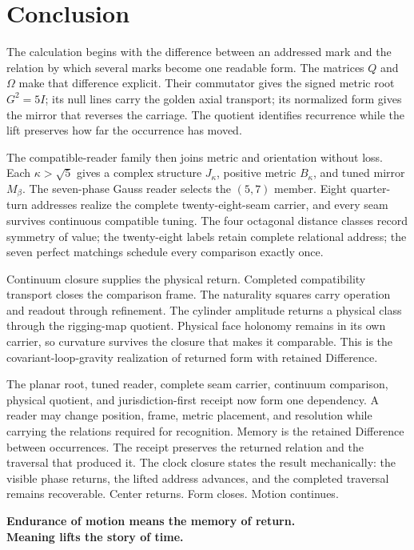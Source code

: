 \documentclass[10pt]{article}
\begin{document}
\section{Conclusion}
The calculation begins with the difference between an addressed mark and the relation by which several marks become one readable form. The matrices $Q$ and $\Omega$ make that difference explicit. Their commutator gives the signed metric root $G^2=5I$; its null lines carry the golden axial transport; its normalized form gives the mirror that reverses the carriage. The quotient identifies recurrence while the lift preserves how far the occurrence has moved.

The compatible-reader family then joins metric and orientation without loss. Each $\kappa>\sqrt5$ gives a complex structure $J_\kappa$, positive metric $B_\kappa$, and tuned mirror $M_\beta$. The seven-phase Gauss reader selects the $(5,7)$ member. Eight quarter-turn addresses realize the complete twenty-eight-seam carrier, and every seam survives continuous compatible tuning. The four octagonal distance classes record symmetry of value; the twenty-eight labels retain complete relational address; the seven perfect matchings schedule every comparison exactly once.

Continuum closure supplies the physical return. Completed compatibility transport closes the comparison frame. The naturality squares carry operation and readout through refinement. The cylinder amplitude returns a physical class through the rigging-map quotient. Physical face holonomy remains in its own carrier, so curvature survives the closure that makes it comparable. This is the covariant-loop-gravity realization of returned form with retained Difference.

The planar root, tuned reader, complete seam carrier, continuum comparison, physical quotient, and jurisdiction-first receipt now form one dependency. A reader may change position, frame, metric placement, and resolution while carrying the relations required for recognition. Memory is the retained Difference between occurrences. The receipt preserves the returned relation and the traversal that produced it. The clock closure states the result mechanically: the visible phase returns, the lifted address advances, and the completed traversal remains recoverable. Center returns. Form closes. Motion continues.
\begin{center}
\Large\bfseries
Endurance of motion means the memory of return.\\[0.35em]
Meaning lifts the story of time.
\end{center}
\appendix
\end{document}

